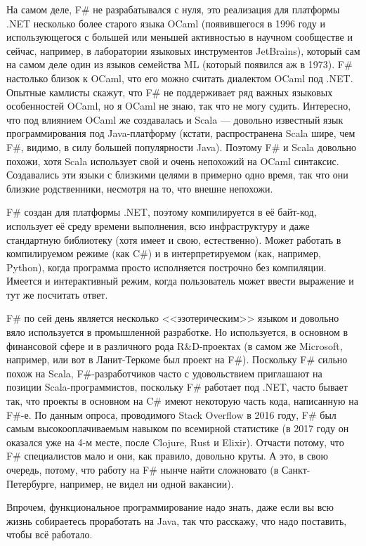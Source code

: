 \documentclass{../../text-style}
\begin{document}
На самом деле, F\# не разрабатывался с нуля, это реализация для платформы .NET несколько более старого языка OCaml (появившегося в 1996 году и использующегося с большей или меньшей активностью в научном сообществе и сейчас, например, в лаборатории языковых инструментов JetBrains), который сам на самом деле один из языков семейства ML (который появился аж в 1973). F\# настолько близок к OCaml, что его можно считать диалектом OCaml под .NET. Опытные камлисты скажут, что F\# не поддерживает ряд важных языковых особенностей OCaml, но я OCaml не знаю, так что не могу судить. Интересно, что под влиянием OCaml же создавалась и Scala --- довольно известный язык программирования под Java-платформу (кстати, распространена Scala шире, чем F\#, видимо, в силу большей популярности Java). Поэтому F\# и Scala довольно похожи, хотя Scala использует свой и очень непохожий на OCaml синтаксис. Создавались эти языки с близкими целями в примерно одно время, так что они близкие родственники, несмотря на то, что внешне непохожи.

F\# создан для платформы .NET, поэтому компилируется в её байт-код, использует её среду времени выполнения, всю инфраструктуру и даже стандартную библиотеку (хотя имеет и свою, естественно). Может работать в компилируемом режиме (как C\#) и в интерпретируемом (как, например, Python), когда программа просто исполняется построчно без компиляции. Имеется и интерактивный режим, когда пользователь может ввести выражение и тут же посчитать ответ.

F\# по сей день является несколько <<эзотерическим>> языком и довольно вяло используется в промышленной разработке. Но используется, в основном в финансовой сфере и в различного рода R\&D-проектах (в самом же Microsoft, например, или вот в Ланит-Теркоме был проект на F\#). Поскольку F\# сильно похож на Scala, F\#-разработчиков часто с удовольствием приглашают на позиции Scala-программистов, поскольку F\# работает под .NET, часто бывает так, что проекты в основном на C\# имеют некоторую часть кода, написанную на F\#-е. По данным опроса, проводимого Stack Overflow в 2016 году, F\# был самым высокооплачиваемым навыком по всемирной статистике (в 2017 году он оказался уже на 4-м месте, после Clojure, Rust и Elixir). Отчасти потому, что F\# специалистов мало и они, как правило, довольно круты. А это, в свою очередь, потому, что работу на F\# нынче найти сложновато (в Санкт-Петербурге, например, не видел ни одной вакансии).

Впрочем, функциональное программирование надо знать, даже если вы всю жизнь собираетесь проработать на Java, так что расскажу, что надо поставить, чтобы всё работало.
\end{document}
